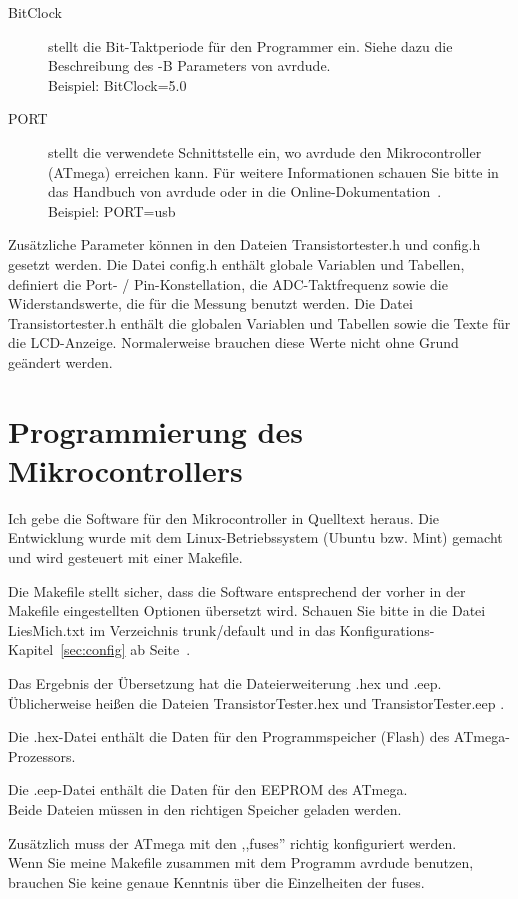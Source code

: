 \begin{description}
  \item[BitClock] stellt die Bit-Taktperiode für den Programmer ein. Siehe dazu die Beschreibung des -B Parameters von avrdude.\\
Beispiel: BitClock=5.0

  \item[PORT] stellt die verwendete Schnittstelle ein, wo avrdude den Mikrocontroller (ATmega) erreichen kann.
  Für weitere Informationen schauen Sie bitte in das Handbuch von avrdude oder in die Online-Dokumentation~\cite{avrdude}.\\
Beispiel: PORT=usb

\end{description}

Zusätzliche Parameter können in den Dateien Transistortester.h und config.h gesetzt werden.
Die Datei config.h enthält globale Variablen und Tabellen, definiert die Port- / Pin-Konstellation,
die ADC-Taktfrequenz sowie die Widerstandswerte, die für die Messung benutzt werden.
Die Datei Transistortester.h enthält die globalen Variablen und Tabellen sowie die Texte für die LCD-Anzeige.
Normalerweise brauchen diese Werte nicht ohne Grund geändert werden.


\section{Programmierung des Mikrocontrollers}
Ich gebe die Software für den Mikrocontroller in Quelltext heraus.
Die Entwicklung wurde mit dem Linux-Betriebssystem (Ubuntu bzw. Mint) gemacht
und wird gesteuert mit einer Makefile.

Die Makefile stellt sicher, dass die Software entsprechend der vorher in der Makefile 
eingestellten Optionen übersetzt wird. Schauen Sie bitte in die Datei LiesMich.txt
im Verzeichnis trunk/default und in das Konfigurations-Kapitel~\ref{sec:config} ab Seite~\pageref{sec:config}.

Das Ergebnis der Übersetzung hat die Dateierweiterung .hex und .eep.\\
Üblicherweise heißen die Dateien TransistorTester.hex und TransistorTester.eep .

Die .hex-Datei enthält die Daten für den Programmspeicher (Flash) des ATmega-Prozessors.

Die .eep-Datei enthält die Daten für den EEPROM des ATmega.\\
Beide Dateien müssen in den richtigen Speicher geladen werden.

Zusätzlich muss der ATmega mit den ,,fuses'' richtig konfiguriert werden.\\
Wenn Sie meine Makefile zusammen mit dem Programm avrdude \cite{avrdude} benutzen, brauchen Sie
keine genaue Kenntnis über die Einzelheiten der fuses.

